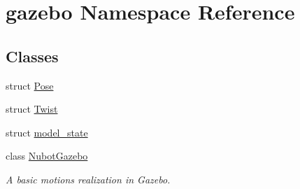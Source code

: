 \hypertarget{namespacegazebo}{\section{gazebo Namespace Reference}
\label{namespacegazebo}
}
\subsection*{Classes}
\begin{DoxyCompactItemize}
\item 
struct \hyperlink{structgazebo_1_1Pose}{Pose}
\item 
struct \hyperlink{structgazebo_1_1Twist}{Twist}
\item 
struct \hyperlink{structgazebo_1_1model__state}{model\-\_\-state}
\item 
class \hyperlink{classgazebo_1_1NubotGazebo}{Nubot\-Gazebo}
\begin{DoxyCompactList}\small\item\em A basic motions realization in Gazebo. \end{DoxyCompactList}\end{DoxyCompactItemize}

